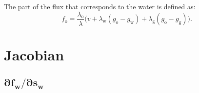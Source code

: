 \documentclass{article}
\newcommand{\water}{\text{w}}
\newcommand{\oil}{\text{o}}
\newcommand{\gas}{\text{g}}
\begin{document}
The part of the flux that corresponds to the water is defined as:
\begin{equation}\label{fw}
f_\oil = \frac{\lambda_\oil}{\lambda} \bigl( v + \lambda_\water(g_\oil - g_\water) + \lambda_\gas(g_\oil - g_\gas) \bigr).
\end{equation}

\section{Jacobian}

\subsection{$\boldsymbol{\partial f_\water/\partial s_\water}$}\label{dfw_dsw}
\end{document}
